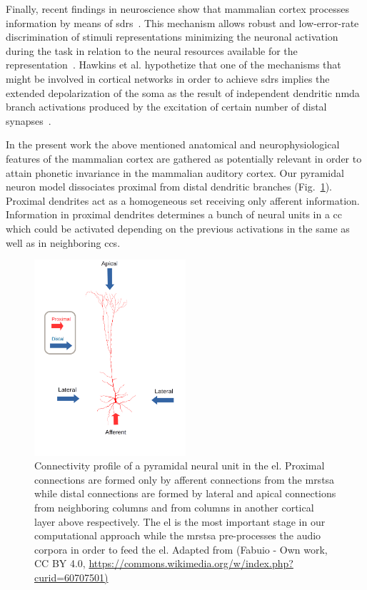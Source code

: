 {Finally, recent findings in neuroscience show that mammalian cortex processes information by means of \glspl{sdr}~\cite{barth_2012}. This mechanism allows robust and low-error-rate discrimination of stimuli representations minimizing the neuronal activation during the task in relation to the neural resources available for the representation~\cite{ahmad_2016}. Hawkins et al. \cite{hawkins_2016} hypothetize that one of the mechanisms that might be involved in cortical networks in order to achieve \glspl{sdr} implies the extended depolarization of the soma as the result of independent dendritic \gls{nmda} branch activations produced by the excitation of certain number of distal synapses~\cite{antic_2010, major_2013}.

In the present work the above mentioned anatomical and neurophysiological features of the mammalian cortex are gathered as potentially relevant in order to attain phonetic invariance in the mammalian auditory cortex. Our pyramidal neuron model dissociates proximal from distal dendritic branches (Fig.~\ref{fig:PyramidalCell}). Proximal dendrites act as a homogeneous set receiving only afferent information. Information in proximal dendrites determines a bunch of neural units in a \gls{cc} which could be activated depending on the previous activations in the same as well as in neighboring \glspl{cc}.

\begin{figure}[h!]
    \centering
    \includegraphics[width=0.5\textwidth]{PyramidalCell.png}
    \caption{Connectivity profile of a pyramidal neural unit in the \gls{el}.
    Proximal connections are formed only by afferent connections from the \gls{mrstsa}
    while distal connections are formed by lateral and apical connections from neighboring columns and
    from columns in another cortical layer above respectively.
    The \gls{el} is the most important stage in our computational approach while the \gls{mrstsa} pre-processes the audio corpora in order to feed the \gls{el}.
    Adapted from 
    (Fabuio - Own work, CC BY 4.0, \url{https://commons.wikimedia.org/w/index.php?curid=60707501)}}
    \label{fig:PyramidalCell}
\end{figure}

}
